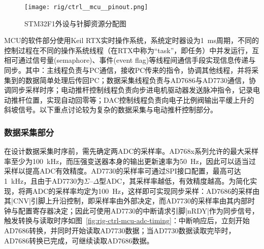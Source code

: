 \begin{figure}[tbhp]
\centering
\texttt{[image: rig/ctrl\_\_mcu\_\_pinout.png]}
\caption{STM32F1外设与针脚资源分配图}
\label{fig:rig-ctrl-mcu-pinout}
\end{figure}

MCU的软件部分使用Keil RTX实时操作系统，系统定时器设为\SI{1}{\milli\second}周期，不同的控制过程在不同的操作系统线程（在RTX中称为``task''，即任务）中并发运行，互相可通过信号量(semaphore)、事件(event flag)等线程间通信手段实现信息传递与同步。其中：主线程负责与PC通信，接收PC传来的指令，协调其他线程，并将采集到的数据简单处理后传回PC；数据采集线程负责与AD7686与AD7730通信，协调同步采样时序；电动推杆控制线程负责向步进电机驱动器发送脉冲指令，记录电动推杆位置，实现自动回零等；DAC控制线程负责向电子比例阀输出平缓上升的斜坡信号。以下重点讨论较为复杂的数据采集与电动推杆控制部分。

\subsubsection{数据采集部分}\label{sec:rig-ctrl-mcu-adc}

在设计数据采集时序前，需先确定两ADC的采样率。AD768x系列允许的最大采样率至少为\SI{100}{\kilo\hertz}，而压强变送器本身的输出更新速率为\SI{50}{\hertz}，因此可以适当过采样以提高ADC有效精度。AD7730的采样率可通过SPI接口配置，最高可达\SI{1}{\kilo\hertz}，且由于AD7730为$\Sigma$--$\Delta$型ADC，其采样率越低，有效精度越高。为简化实现，将两ADC的采样率均定为\SI{100}{\hertz}，这样即可实现同步采样：AD7686的采样由其\bverb|CNV|引脚上升沿控制，即采样率由外部决定，而AD7730的采样率由其内部时钟与配置寄存器决定；因此可使用AD7730的中断请求引脚\bverb|nRDY|作为同步信号，触发转换与读取时序如图~\ref{fig:rig-ctrl-mcu-adc-timing}：中断响应后，立刻开始AD7686转换，并同时开始读取AD7730数据；当AD7730数据读取完毕时，AD7686转换已完成，可继续读取AD7686数据。

